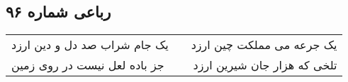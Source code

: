 \begin{center}
\section*{رباعی شماره ۹۶}
\label{sec:sh096}
\begin{longtable}{l p{0.5cm} r}
یک جام شراب صد دل و دین ارزد
&&
یک جرعه می مملکت چین ارزد
\\
جز باده لعل نیست در روی زمین
&&
تلخی که هزار جان شیرین ارزد
\\
\end{longtable}
\end{center}
